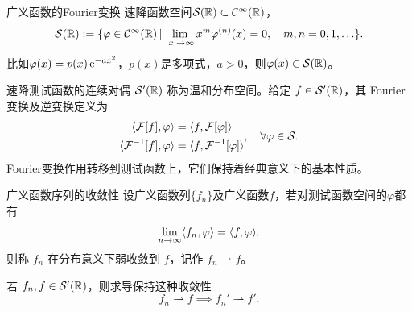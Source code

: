 \begin{theorem}{广义函数的Fourier变换}{}
	速降函数空间$\mathcal S(\mathbb{R}) \subset \mathcal{C}^\infty(\mathbb{R})$，%
	\begin{align}
		\mathcal S(\mathbb{R}) := \{\varphi \in \mathcal{C}^\infty(\mathbb{R})\,\vert\,\lim_{\lvert x\rvert\to\infty}x^m\varphi^{(n)}(x) = 0,\quad m,n = 0,1,\ldots\}.
	\end{align}
	比如$\varphi(x) = p(x)\mathop{}\!\mathrm{e}^{-ax^2}$，$p(x)$是多项式，$a > 0$，则$\varphi(x) \in \mathcal S(\mathbb{R})$。
	
	速降测试函数的连续对偶 $\mathcal S'(\mathbb{R})$ 称为温和分布空间。给定 $f \in \mathcal S'(\mathbb{R})$，其 Fourier 变换及逆变换定义为
	\begin{align}
		\begin{aligned}
			\langle\operatorname{\mathcal{F}}[f],\varphi\rangle &= \langle f,\operatorname{\mathcal{F}}[\varphi]\rangle\\
			\langle\operatorname{\mathcal{F}}^{-1}[f],\varphi\rangle &= \langle f,\operatorname{\mathcal{F}}^{-1}[\varphi]\rangle
		\end{aligned},\quad\forall\varphi \in \mathcal S.
	\end{align}
	Fourier变换作用转移到测试函数上，它们保持着经典意义下的基本性质。
\end{theorem}
\begin{theorem}{广义函数序列的收敛性}{}
	设广义函数列$\{f_n\}$及广义函数$f$，若对测试函数空间的$\varphi$都有
	\begin{equation}
		\label{eq:mmp-distributional-convergence}
		\lim_{n\to\infty}\langle f_n,\varphi\rangle = \langle f,\varphi\rangle.
	\end{equation}
	则称 $f_n$ 在分布意义下弱收敛到 $f$，记作 $f_n\rightharpoonup f$。
\end{theorem}
\begin{theorem}{}{}
	若 $f_n,f \in \mathcal S'(\mathbb{R})$，则求导保持这种收敛性
	\begin{equation}
		\label{eq:mmp-weak-derivative-continuity}
		f_n\rightharpoonup f \implies f_n'\rightharpoonup f'.
	\end{equation}
\end{theorem}
